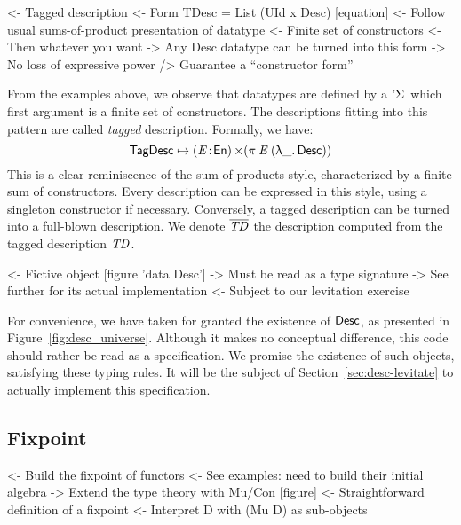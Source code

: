 \begin{wstructure}
<- Tagged description
    <- Form TDesc = List (UId x Desc) [equation]
    <- Follow usual sums-of-product presentation of datatype
        <- Finite set of constructors
        <- Then whatever you want
    -> Any Desc datatype can be turned into this form
        -> No loss of expressive power
        /> Guarantee a ``constructor form''
\end{wstructure}

From the examples above, we observe that datatypes are defined by a
$\DSigma{\!}{\!}$ which first argument is a finite set of
constructors. The descriptions fitting into this pattern are called
\emph{tagged} description. Formally, we have:
%
\[
 \TagDesc \mapsto \SIGMA{\V{E}}{\EnumU} (\spi{\V{E}}{(\LAM{\_} \Desc)})
\]
%
This is a clear reminiscence of the sum-of-products style,
characterized by a finite sum of constructors. Every description can
be expressed in this style, using a singleton constructor if
necessary. Conversely, a tagged description can be turned into a
full-blown description. We denote $\toDesc{\V{TD}}$ the description
computed from the tagged description $\V{TD}$.

\begin{wstructure}
<- Fictive object [figure 'data Desc']
    -> Must be read as a type signature
    -> See further for its actual implementation
        <- Subject to our levitation exercise
\end{wstructure}

For convenience, we have taken for granted the existence of $\Desc$,
as presented in Figure~\ref{fig:desc_universe}. Although it makes no
conceptual difference, this code should rather be read as a
specification. We promise the existence of such objects, satisfying
these typing rules. It will be the subject of
Section~\ref{sec:desc-levitate} to actually implement this
specification.

\subsection{Fixpoint}
\label{sec:desc-fix-point}

\begin{wstructure}
<- Build the fixpoint of functors
    <- See examples: need to build their initial algebra
    -> Extend the type theory with Mu/Con [figure]
        <- Straightforward definition of a fixpoint
            <- Interpret D with (Mu D) as sub-objects
\end{wstructure}


